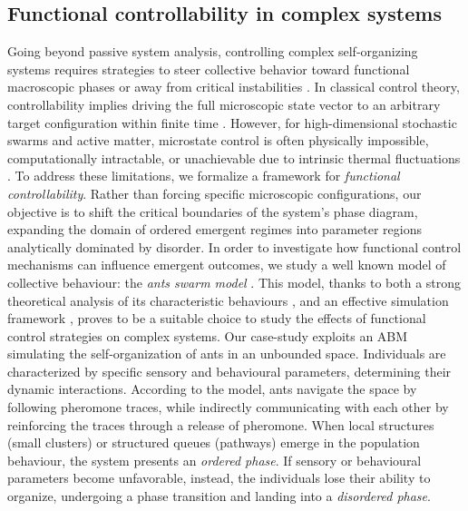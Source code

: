 \documentclass[openacc]{rsproca_new}
\begin{document}
\subsection{Functional controllability in complex systems}
Going beyond passive system analysis, controlling complex self-organizing systems requires strategies to steer collective behavior toward functional macroscopic phases or away from critical instabilities \cite{reviewCScontrol, controllability}. In classical control theory, controllability implies driving the full microscopic state vector to an arbitrary target configuration within finite time \cite{controllability}. However, for high-dimensional stochastic swarms and active matter, microstate control is often physically impossible, computationally intractable, or unachievable due to intrinsic thermal fluctuations \cite{robres}.
To address these limitations, we formalize a framework for \textit{functional controllability}. Rather than forcing specific microscopic configurations, our objective is to shift the critical boundaries of the system's phase diagram, expanding the domain of ordered emergent regimes into parameter regions analytically dominated by disorder. 
In order to investigate how functional control mechanisms can influence emergent outcomes, we study a well known model of collective behaviour: the \textit{ants swarm model} \cite{patternformation}. This model, thanks to both a strong theoretical analysis of its characteristic behaviours \cite{SwarmPhaseTrans}, and an effective simulation framework \cite{chialvoswarms}, proves to be a suitable choice to study the effects of functional control strategies on complex systems.
Our case-study exploits an ABM simulating the self-organization of ants in an unbounded space.  
Individuals are characterized by specific sensory and behavioural parameters, determining their dynamic interactions. According to the model, ants navigate the space by following pheromone traces, while indirectly communicating with each other by reinforcing the traces through a release of pheromone. When local structures (small clusters) or structured queues (pathways) emerge in the population behaviour, the system presents an \textit{ordered phase}. If sensory or behavioural parameters become unfavorable, instead, the individuals lose their ability to organize, undergoing a phase transition and landing into a \textit{disordered phase}. 
\end{document}
